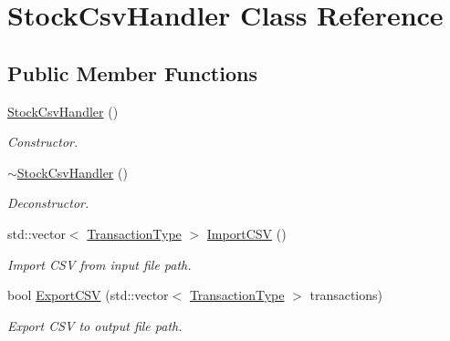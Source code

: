 \hypertarget{class_stock_csv_handler}{}\section{Stock\+Csv\+Handler Class Reference}
\label{class_stock_csv_handler}
\subsection*{Public Member Functions}
\begin{DoxyCompactItemize}
\item 
\mbox{\label{class_stock_csv_handler_a79a39d762f4dd87f82ee927c33f596cc}} 
\mbox{\hyperlink{class_stock_csv_handler_a79a39d762f4dd87f82ee927c33f596cc}{Stock\+Csv\+Handler}} ()
\begin{DoxyCompactList}\small\item\em Constructor. \end{DoxyCompactList}\item 
\mbox{\label{class_stock_csv_handler_a9c197759533cc003c511d784a1cdb521}} 
\mbox{\hyperlink{class_stock_csv_handler_a9c197759533cc003c511d784a1cdb521}{$\sim$\+Stock\+Csv\+Handler}} ()
\begin{DoxyCompactList}\small\item\em Deconstructor. \end{DoxyCompactList}\item 
\mbox{\label{class_stock_csv_handler_a3b32398ef8bf2994162802496d721333}} 
std\+::vector$<$ \mbox{\hyperlink{class_transaction_type}{Transaction\+Type}} $>$ \mbox{\hyperlink{class_stock_csv_handler_a3b32398ef8bf2994162802496d721333}{Import\+C\+SV}} ()
\begin{DoxyCompactList}\small\item\em Import C\+SV from input file path. \end{DoxyCompactList}\item 
\mbox{\label{class_stock_csv_handler_a5302fb4580cc69a73aa22a6e97e314ad}} 
bool \mbox{\hyperlink{class_stock_csv_handler_a5302fb4580cc69a73aa22a6e97e314ad}{Export\+C\+SV}} (std\+::vector$<$ \mbox{\hyperlink{class_transaction_type}{Transaction\+Type}} $>$ transactions)
\begin{DoxyCompactList}\small\item\em Export C\+SV to output file path. \end{DoxyCompactList}\item 

\end{DoxyCompactItemize}
